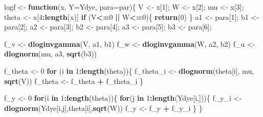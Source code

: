 \documentclass[
]{article}
\newenvironment{Shaded}{\begin{snugshade}}{\end{snugshade}}
\newcommand{\AttributeTok}[1]{\textcolor[rgb]{0.13,0.29,0.53}{#1}}
\newcommand{\ControlFlowTok}[1]{\textcolor[rgb]{0.13,0.29,0.53}{\textbf{#1}}}
\newcommand{\DecValTok}[1]{\textcolor[rgb]{0.00,0.00,0.81}{#1}}
\newcommand{\FunctionTok}[1]{\textcolor[rgb]{0.13,0.29,0.53}{\textbf{#1}}}
\newcommand{\NormalTok}[1]{#1}
\newcommand{\OtherTok}[1]{\textcolor[rgb]{0.56,0.35,0.01}{#1}}
\newcommand{\SpecialCharTok}[1]{\textcolor[rgb]{0.81,0.36,0.00}{\textbf{#1}}}
\begin{document}
\begin{Shaded}
\begin{Highlighting}[]
\NormalTok{logf }\OtherTok{\textless{}{-}} \ControlFlowTok{function}\NormalTok{(x, }\AttributeTok{Y=}\NormalTok{Ydye, }\AttributeTok{para=}\NormalTok{par)\{}
\NormalTok{  V }\OtherTok{\textless{}{-}}\NormalTok{ x[}\DecValTok{1}\NormalTok{]; W }\OtherTok{\textless{}{-}}\NormalTok{ x[}\DecValTok{2}\NormalTok{]; mu }\OtherTok{\textless{}{-}}\NormalTok{ x[}\DecValTok{3}\NormalTok{]; theta }\OtherTok{\textless{}{-}}\NormalTok{ x[}\DecValTok{4}\SpecialCharTok{:}\FunctionTok{length}\NormalTok{(x)]}
  \ControlFlowTok{if}\NormalTok{  (V}\SpecialCharTok{\textless{}=}\DecValTok{0} \SpecialCharTok{||}\NormalTok{ W}\SpecialCharTok{\textless{}=}\DecValTok{0}\NormalTok{)\{}
    \FunctionTok{return}\NormalTok{(}\DecValTok{0}\NormalTok{)}
\NormalTok{  \}}
\NormalTok{  a1 }\OtherTok{\textless{}{-}}\NormalTok{ para[}\DecValTok{1}\NormalTok{]; b1 }\OtherTok{\textless{}{-}}\NormalTok{ para[}\DecValTok{2}\NormalTok{]; a2 }\OtherTok{\textless{}{-}}\NormalTok{ para[}\DecValTok{3}\NormalTok{]; b2 }\OtherTok{\textless{}{-}}\NormalTok{ para[}\DecValTok{4}\NormalTok{]; a3 }\OtherTok{\textless{}{-}}\NormalTok{ para[}\DecValTok{5}\NormalTok{]; b3 }\OtherTok{\textless{}{-}}\NormalTok{ para[}\DecValTok{6}\NormalTok{];}
  
\NormalTok{  f\_v }\OtherTok{\textless{}{-}} \FunctionTok{dloginvgamma}\NormalTok{(V, a1, b1)}
\NormalTok{  f\_w }\OtherTok{\textless{}{-}} \FunctionTok{dloginvgamma}\NormalTok{(W, a2, b2)}
\NormalTok{  f\_u }\OtherTok{\textless{}{-}} \FunctionTok{dlognorm}\NormalTok{(mu, a3, }\FunctionTok{sqrt}\NormalTok{(b3))}
  
\NormalTok{  f\_theta }\OtherTok{\textless{}{-}} \DecValTok{0}
  \ControlFlowTok{for}\NormalTok{ (i }\ControlFlowTok{in} \DecValTok{1}\SpecialCharTok{:}\FunctionTok{length}\NormalTok{(theta))\{}
\NormalTok{    f\_theta\_i }\OtherTok{\textless{}{-}} \FunctionTok{dlognorm}\NormalTok{(theta[i], mu, }\FunctionTok{sqrt}\NormalTok{(V))}
\NormalTok{    f\_theta }\OtherTok{\textless{}{-}}\NormalTok{ f\_theta }\SpecialCharTok{+}\NormalTok{ f\_theta\_i}
\NormalTok{  \}}
  
\NormalTok{  f\_y }\OtherTok{\textless{}{-}} \DecValTok{0}
  \ControlFlowTok{for}\NormalTok{(i }\ControlFlowTok{in} \DecValTok{1}\SpecialCharTok{:}\FunctionTok{length}\NormalTok{(theta))\{}
    \ControlFlowTok{for}\NormalTok{(j }\ControlFlowTok{in} \DecValTok{1}\SpecialCharTok{:}\FunctionTok{length}\NormalTok{(Ydye[i,]))\{}
\NormalTok{      f\_y\_i }\OtherTok{\textless{}{-}} \FunctionTok{dlognorm}\NormalTok{(Ydye[i,j],theta[i],}\FunctionTok{sqrt}\NormalTok{(W))}
\NormalTok{      f\_y }\OtherTok{\textless{}{-}}\NormalTok{ f\_y }\SpecialCharTok{+}\NormalTok{ f\_y\_i}
\NormalTok{    \}}
\NormalTok{  \}}
  

\end{Highlighting}
\end{Shaded}
\end{document}

